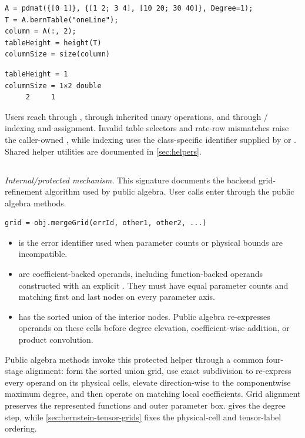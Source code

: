 \examplehead
\begin{lstlisting}[style=dpmatlab]
A = pdmat({[0 1]}, {[1 2; 3 4], [10 20; 30 40]}, Degree=1);
T = A.bernTable("oneLine");
column = A(:, 2);
tableHeight = height(T)
columnSize = size(column)
\end{lstlisting}
\begin{lstlisting}[style=dpoutput]
tableHeight = 1
columnSize = 1×2 double
     2     1
\end{lstlisting}

\remarkshead
Users reach  through ,  through inherited unary operations, and  through / indexing and assignment. Invalid table selectors and rate-row mismatches raise the caller-owned , while indexing uses the class-specific identifier supplied by  or . Shared helper utilities are documented in \cref{sec:helpers}.

\subsection{\texorpdfstring{}{mergeGrid}}
\label{sec:pdbase-mergegrid}

\textit{Internal/protected mechanism.} This signature documents the backend grid-refinement algorithm used by public algebra. User calls enter through the public algebra methods.

\syntaxhead
\begin{lstlisting}[style=dpsyntax]
grid = obj.mergeGrid(errId, other1, other2, ...)
\end{lstlisting}

\arghead
\begin{itemize}[leftmargin=*]
    \item {} is the error identifier used when parameter counts or physical bounds are incompatible. \item {} are coefficient-backed operands, including function-backed operands constructed with an explicit . They must have equal parameter counts and matching first and last nodes on every parameter axis. \item {} has the sorted union of the interior nodes.  Public algebra re-expresses operands on these cells before degree elevation, coefficient-wise addition, or product convolution.
\end{itemize}
Public algebra methods invoke this protected helper through a common four-stage alignment: form the sorted union grid, use exact subdivision to re-express every operand on its physical cells, elevate direction-wise to the componentwise maximum degree, and then operate on matching local coefficients. Grid alignment preserves the represented functions and outer parameter box.  gives the degree step, while \cref{sec:bernstein-tensor-grids} fixes the physical-cell and tensor-label ordering.


